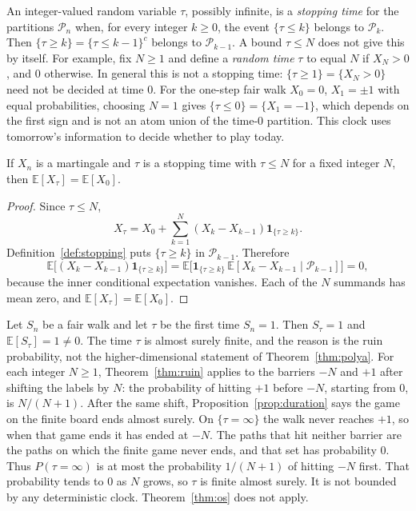 \begin{definition}\label{def:stopping}
An integer-valued random variable $\tau$, possibly infinite, is a \emph{stopping time} for the partitions $\mathcal P_n$ when, for every integer $k\ge0$, the event $\{\tau\le k\}$ belongs to $\mathcal P_k$. Then $\{\tau\ge k\}=\{\tau\le k-1\}^c$ belongs to $\mathcal P_{k-1}$. A bound $\tau\le N$ does not give this by itself. For example, fix $N\ge1$ and define a \emph{random time} $\tau$ to equal $N$ if $X_N>0$, and $0$ otherwise. In general this is not a stopping time: $\{\tau\ge1\}=\{X_N>0\}$ need not be decided at time $0$. For the one-step fair walk $X_0=0$, $X_1=\pm1$ with equal probabilities, choosing $N=1$ gives $\{\tau\le0\}=\{X_1=-1\}$, which depends on the first sign and is not an atom union of the time-$0$ partition. This clock uses tomorrow's information to decide whether to play today.
\end{definition}

\begin{theorem}\label{thm:os}
If $X_n$ is a martingale and $\tau$ is a stopping time with $\tau\le N$ for a fixed integer $N$, then $\mathbb E[X_\tau]=\mathbb E[X_0]$.
\end{theorem}
\begin{proof}
Since $\tau\le N$,
\[
 X_\tau=X_0+\sum_{k=1}^N (X_k-X_{k-1})\mathbf 1_{\{\tau\ge k\}}.
\]
Definition~\ref{def:stopping} puts $\{\tau\ge k\}$ in $\mathcal P_{k-1}$. Therefore
\[
 \mathbb E\bigl[(X_k-X_{k-1})\mathbf 1_{\{\tau\ge k\}}\bigr]
 =\mathbb E\bigl[\mathbf 1_{\{\tau\ge k\}}\,\mathbb E[X_k-X_{k-1}\mid\mathcal P_{k-1}]\bigr]=0,
\]
because the inner conditional expectation vanishes. Each of the $N$ summands has mean zero, and $\mathbb E[X_\tau]=\mathbb E[X_0]$.
\end{proof}

\begin{examplex}
Let $S_n$ be a fair walk and let $\tau$ be the first time $S_n=1$. Then $S_\tau=1$ and $\mathbb E[S_\tau]=1\ne0$. The time $\tau$ is almost surely finite, and the reason is the ruin probability, not the higher-dimensional statement of Theorem~\ref{thm:polya}. For each integer $N\ge1$, Theorem~\ref{thm:ruin} applies to the barriers $-N$ and $+1$ after shifting the labels by $N$: the probability of hitting $+1$ before $-N$, starting from $0$, is $N/(N+1)$. After the same shift, Proposition~\ref{prop:duration} says the game on the finite board ends almost surely. On $\{\tau=\infty\}$ the walk never reaches $+1$, so when that game ends it has ended at $-N$. The paths that hit neither barrier are the paths on which the finite game never ends, and that set has probability $0$. Thus $P(\tau=\infty)$ is at most the probability $1/(N+1)$ of hitting $-N$ first. That probability tends to $0$ as $N$ grows, so $\tau$ is finite almost surely. It is not bounded by any deterministic clock. Theorem~\ref{thm:os} does not apply.
\end{examplex}

